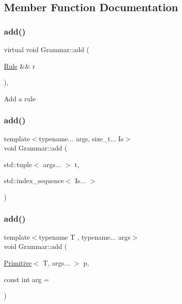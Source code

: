 \subsection{Member Function Documentation}
\mbox{\label{class_grammar_af0b97cbaf14fc6be7495c8bb9e888002}} 
\subsubsection{\texorpdfstring{add()}{add()}\hspace{0.1cm}{\footnotesize\ttfamily [1/6]}}
{\footnotesize\ttfamily virtual void Grammar\+::add (\begin{DoxyParamCaption}\item[{\hyperlink{class_rule}{Rule} \&\&}]{r }\end{DoxyParamCaption})\hspace{0.3cm}{\ttfamily [inline]}, {\ttfamily [virtual]}}

Add a rule\mbox{\label{class_grammar_a37a1dd90b7a315fe97bbdefad7c09df9}} 
\subsubsection{\texorpdfstring{add()}{add()}\hspace{0.1cm}{\footnotesize\ttfamily [2/6]}}
{\footnotesize\ttfamily template$<$typename... args, size\+\_\+t... Is$>$ \\
void Grammar\+::add (\begin{DoxyParamCaption}\item[{std\+::tuple$<$ args... $>$}]{t,  }\item[{std\+::index\+\_\+sequence$<$ Is... $>$}]{ }\end{DoxyParamCaption})\hspace{0.3cm}{\ttfamily [inline]}}

\mbox{\label{class_grammar_a0af8f369b948cde8ee5d403311ec8fa9}} 
\subsubsection{\texorpdfstring{add()}{add()}\hspace{0.1cm}{\footnotesize\ttfamily [3/6]}}
{\footnotesize\ttfamily template$<$typename T , typename... args$>$ \\
void Grammar\+::add (\begin{DoxyParamCaption}\item[{\hyperlink{struct_primitive}{Primitive}$<$ T, args... $>$}]{p,  }\item[{const int}]{arg = {} }\end{DoxyParamCaption})\hspace{0.3cm}{\ttfamily [inline]}}

